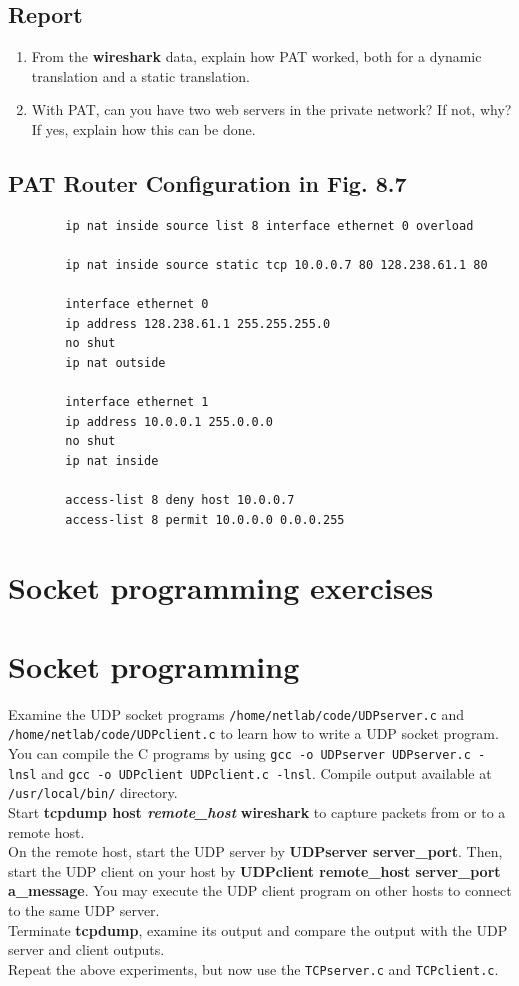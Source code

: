 \documentclass{../UTNetLab}
\begin{document}
    \subsection*{Report}
    \begin{enumerate}
        \item From the \textbf{wireshark} data, explain how PAT worked, both for a dynamic translation and a static translation.
        \item With PAT, can you have two web servers in the private network?
        If not, why?
        If yes, explain how this can be done.
    \end{enumerate}

    \subsection*{PAT Router Configuration in Fig. 8.7}
    \begin{verbatim}
        ip nat inside source list 8 interface ethernet 0 overload

        ip nat inside source static tcp 10.0.0.7 80 128.238.61.1 80

        interface ethernet 0
        ip address 128.238.61.1 255.255.255.0
        no shut
        ip nat outside

        interface ethernet 1
        ip address 10.0.0.1 255.0.0.0
        no shut
        ip nat inside

        access-list 8 deny host 10.0.0.7
        access-list 8 permit 10.0.0.0 0.0.0.255
    \end{verbatim}

\section*{Socket programming exercises}
\section{Socket programming}
    Examine the UDP socket programs \texttt{/home/netlab/code/UDPserver.c} and \texttt{/home/netlab/code/UDPclient.c} to learn how to write a UDP socket program.
    You can compile the C programs by using \texttt{gcc -o UDPserver UDPserver.c -lnsl} and \texttt{gcc -o UDPclient UDPclient.c -lnsl}. Compile output available at \texttt{/usr/local/bin/} directory.\\
    Start \textbf{tcpdump host \textit{remote\_host}} \textbf{wireshark} to capture packets from or to a remote host. \\
    On the remote host, start the UDP server by \textbf{UDPserver server\_port}.
    Then, start the UDP client on your host by \textbf{UDPclient remote\_host server\_port a\_message}.
    You may execute the UDP client program on other hosts to connect to the same UDP server.\\
    Terminate \textbf{tcpdump}, examine its output and compare the output with the UDP server and client outputs.\\
    Repeat the above experiments, but now use the \texttt{TCPserver.c} and \texttt{TCPclient.c}.
\end{document}
